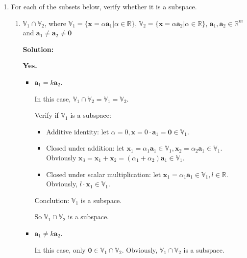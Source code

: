 \documentclass[12pt, letterpaper, onecolumn]{article}
\begin{document}
	\begin{enumerate}[start=2]
		\item{
			For each of the subsets below, verify whether it is a subspace.%
			\begin{enumerate}%
				\item %
				$\mathbb{V}_{1} \cap \mathbb{V}_{2}$, where 
				$\mathbb{V}_{1}=\{\bm{x}=\alpha \bm{a}_{1} | \alpha \in \mathbb{R}\}$, 
				$\mathbb{V}_{2}=\{\bm{x}=\alpha \bm{a}_{2} | \alpha \in \mathbb{R}\}$, 
				$\bm{a}_{1}, \bm{a}_{2} \in \mathbb{R}^m $ and $\bm{a}_{1} \neq \bm{a}_{2} \neq \bm{0} $

				\textbf{Solution:}

                \textbf{Yes.}

                \begin{itemize}
                    \item $\bm{a}_1 = k \bm{a}_2$. 
                    
                    In this case, $\mathbb{V}_{1} \cap \mathbb{V}_{2} = \mathbb{V}_{1} = \mathbb{V}_{2}$. 

                    Verify if $\mathbb{V}_{1}$ is a subspace:

                    \begin{itemize}
                        \item Additive identity: let $\alpha = 0, \bm{x} = 0 \cdot \bm{a}_1 = \bm{0} \in \mathbb{V}_1$.
                        \item Closed under addition: let $\bm{x}_1 = \alpha_1 \bm{a}_1 \in \mathbb{V}_1, \bm{x}_2 = \alpha_2 \bm{a}_1 \in \mathbb{V}_1$. Obviously $\bm{x}_3 = \bm{x}_1 + \bm{x}_2 = (\alpha_1 + \alpha_2) \bm{a}_1 \in \mathbb{V}_1$.
                        \item Closed under scalar multiplication: let $\bm{x}_1 = \alpha_1 \bm{a}_1 \in \mathbb{V}_1, l \in \mathbb{R}$. Obviously, $l \cdot \bm{x}_1 \in \mathbb{V}_1$.
                    \end{itemize}

                    Conclution: $\mathbb{V}_{1}$ is a subspace.

                    So $\mathbb{V}_{1} \cap \mathbb{V}_{2}$ is a subspace.
                    \item $\bm{a}_1 \neq k \bm{a}_2$.
                    
                    In this case, only $\bm{0} \in \mathbb{V}_{1} \cap \mathbb{V}_{2}$. Obviously, $\mathbb{V}_{1} \cap \mathbb{V}_{2}$ is a subspace.
                \end{itemize}


\end{enumerate}}
\end{enumerate}
\end{document}
